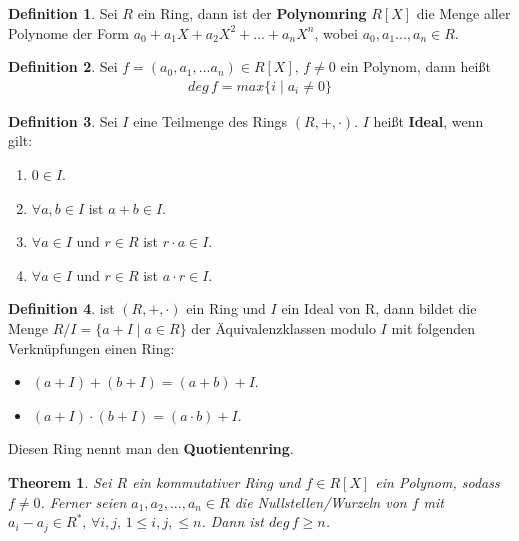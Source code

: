 \documentclass[12pt,oneside]{article}
\newtheorem{theorem}{Theorem}[section]
\theoremstyle{remark}
\theoremstyle{definition}
\newtheorem{definition}{Definition}[section]
\begin{document}
\begin{definition}
Sei $R$ ein Ring, dann ist der \textbf{Polynomring} $R[X]$ die Menge aller Polynome der Form $a_{0} + a_{1}X + a_{2} X^2 + ... + a_{n}X^n$, wobei $a_{0},a_{1}...,a_{n} \in R$.
\end{definition}

\smallskip

\begin{definition}
Sei $f = (a_0, a_1,...a_n) \in R[X], \, f \neq 0 $ ein Polynom, dann heißt
\begin{align*}
    deg \, f = max \{ i  \mid a_i \neq 0 \}
\end{align*}
\end{definition}

\smallskip

\begin{definition}
Sei $I$ eine Teilmenge des Rings $(R,+,\cdot)$. $I$ heißt \textbf{Ideal}, wenn gilt:
\begin{enumerate}
    \item $0 \in I$.
    \item $\forall a,b \in I$ ist $a + b \in I$.
    \item $\forall a \in I$ und $r \in R$ ist $r \cdot a \in I$.
    \item $\forall a \in I$ und $r \in R$ ist $a \cdot r \in I$.
\end{enumerate}
\end{definition}

\smallskip 

\begin{definition}
ist $(R, +, \cdot)$ ein Ring und $I$ ein Ideal von R, dann bildet die Menge $R/I = \{ a + I \mid a \in R\}$ der Äquivalenzklassen modulo $I$ mit folgenden Verknüpfungen einen Ring:
\begin{itemize}
    \item $(a + I) + (b + I) = (a + b) + I$.
    \item $(a + I) \cdot (b + I) = (a \cdot b ) + I$.\newline
\end{itemize}
Diesen Ring nennt man den \textbf{Quotientenring}. 
\end{definition}

\smallskip

\begin{theorem}\label{number_of_roots}
Sei $R$ ein kommutativer Ring und $f \in R[X]$ ein Polynom, sodass $f \neq 0$. Ferner seien $a_1, a_2,...,a_n \in R$ die Nullstellen/Wurzeln von $f$ mit $a_i - a_j \in R^*, \, \forall i,j, \, 1 \leq i,j, \leq n$. Dann ist $deg \, f \geq n$.
\end{theorem}
\end{document}
